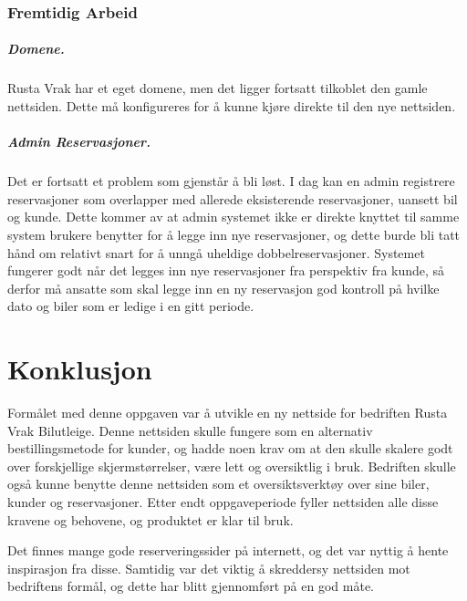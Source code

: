 \subsection*{Fremtidig Arbeid}
\paragraph*{Domene.}
Rusta Vrak har et eget domene, men det ligger fortsatt tilkoblet den gamle nettsiden. Dette må konfigureres for å kunne kjøre direkte til den nye nettsiden.

\paragraph*{Admin Reservasjoner.}
Det er fortsatt et problem som gjenstår å bli løst. I dag kan en admin registrere reservasjoner som overlapper med allerede eksisterende reservasjoner, uansett bil og kunde. Dette kommer av at admin systemet ikke er direkte knyttet til samme system brukere benytter for å legge inn nye reservasjoner, og dette burde bli tatt hånd om relativt snart for å unngå uheldige dobbelreservasjoner. 
Systemet fungerer godt når det legges inn nye reservasjoner fra perspektiv fra kunde, så derfor må ansatte som skal legge inn en ny reservasjon god kontroll på hvilke dato og biler som er ledige i en gitt periode.



\chapter{Konklusjon}
Formålet med denne oppgaven var å utvikle en ny nettside for bedriften Rusta Vrak Bilutleige. Denne nettsiden skulle fungere som en alternativ bestillingsmetode for kunder, og hadde noen krav om at den skulle skalere godt over forskjellige skjermstørrelser, være lett og oversiktlig i bruk. Bedriften skulle også kunne benytte denne nettsiden som et oversiktsverktøy over sine biler, kunder og reservasjoner. Etter endt oppgaveperiode fyller nettsiden alle disse kravene og behovene, og produktet er klar til bruk.

Det finnes mange gode reserveringssider på internett, og det var nyttig å hente inspirasjon fra disse. Samtidig var det viktig å skreddersy nettsiden mot bedriftens formål, og dette har blitt gjennomført på en god måte.

